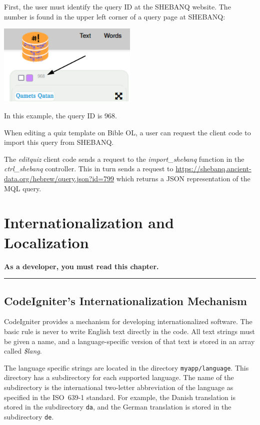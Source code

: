 \documentclass[11pt,oneside,a4paper]{memoir}
\begin{document}
First, the user must identify the query ID at the SHEBANQ website. The number is found in the
upper left corner of a query page at SHEBANQ:

\begin{center}
  \includegraphics[width=0.5\textwidth]{shebanq.png}
\end{center}

In this example, the query ID is 968.

When editing a quiz template on Bible OL, a user can request the client code to import this query
from SHEBANQ.

The \emph{editquiz} client code sends a request to the \emph{import\_shebanq} function in the
\emph{ctrl\_shebanq} controller. This in turn sends a request to
\url{https://shebanq.ancient-data.org/hebrew/query.json?id=799} which returns a JSON representation
of the MQL query.


\chapter{Internationalization and Localization}\label{chap-localize}

\textbf{As a developer, you must read this chapter.}

\plainbreak{3}

\section{CodeIgniter's Internationalization Mechanism}

CodeIgniter provides a mechanism for developing internationalized software. The basic rule is never
to write English text directly in the code. All text strings must be given a name, and a
language-specific version of that text is stored in an array called \emph{\$lang}.

The language specific strings are located in the directory \texttt{myapp/language}. This directory
has a subdirectory for each supported language. The name of the subdirectory is the international
two-letter abbreviation of the language as specified in the ISO~639-1 standard. For example, the
Danish translation is stored in the subdirectory \texttt{da}, and the German translation is stored
in the subdirectory \texttt{de}.
\end{document}
